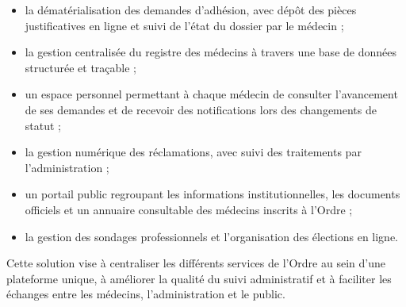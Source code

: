﻿\documentclass[12pt,a4paper]{report}
\begin{document}
\begin{itemize}

\item la dématérialisation des demandes d'adhésion, avec dépôt
des pièces justificatives en ligne et suivi de l'état du dossier
par le médecin ;

\item la gestion centralisée du registre des médecins à travers
une base de données structurée et traçable ;

\item un espace personnel permettant à chaque médecin de consulter
l'avancement de ses demandes et de recevoir des notifications
lors des changements de statut ;

\item la gestion numérique des réclamations, avec suivi des
traitements par l'administration ;

\item un portail public regroupant les informations institutionnelles,
les documents officiels et un annuaire consultable des médecins
inscrits à l'Ordre ;

\item la gestion des sondages professionnels et l'organisation
des élections en ligne.

\end{itemize}

Cette solution vise à centraliser les différents services de l'Ordre
au sein d'une plateforme unique, à améliorer la qualité du suivi
administratif et à faciliter les échanges entre les médecins,
l'administration et le public.





\end{document}

